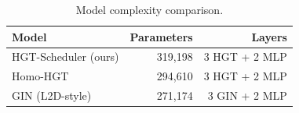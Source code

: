 \begin{table}[t]
  \centering
  \small
  \caption{Model complexity comparison.}
  \label{tab:model_size}
  \begin{tabular}{lrr}
    \toprule
    \textbf{Model} & \textbf{Parameters} & \textbf{Layers} \\
    \midrule
    HGT-Scheduler (ours) & 319,198 & 3 HGT + 2 MLP \\
    Homo-HGT & 294,610 & 3 HGT + 2 MLP \\
    GIN (L2D-style) & 271,174 & 3 GIN + 2 MLP \\
    \bottomrule
  \end{tabular}
\end{table}